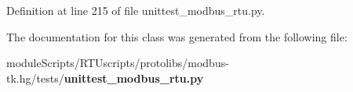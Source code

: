 Definition at line 215 of file unittest\+\_\+modbus\+\_\+rtu.\+py.



The documentation for this class was generated from the following file\+:\begin{DoxyCompactItemize}
\item 
module\+Scripts/\+R\+T\+Uscripts/protolibs/modbus-\/tk.\+hg/tests/{\bf unittest\+\_\+modbus\+\_\+rtu.\+py}\end{DoxyCompactItemize}
